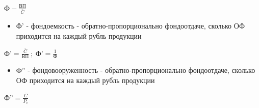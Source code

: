 \documentclass[11pt]{article}
\begin{document}
\begin{math}
  \text{Ф} - \frac{\text{ВП}}{\overline{C}}
\end{math}

\begin{itemize}
\item Ф' - фондоемкость - обратно-пропорционально фондоотдаче, сколько ОФ приходится на каждый рубль продукции
\end{itemize}

\begin{math}
  \text{Ф'} = \frac{\overline{C}}{\text{ВП}} \ ; \   \text{Ф'} = \frac{1}{\text{Ф}}
\end{math}

\begin{itemize}
\item Ф'' - фондовооруженность - обратно-пропорционально фондоотдаче, сколько ОФ приходится на каждый рубль продукции
\end{itemize}

\begin{math}
  \text{Ф''} = \frac{\overline{C}}{P_{c}}
\end{math}
\end{document}
